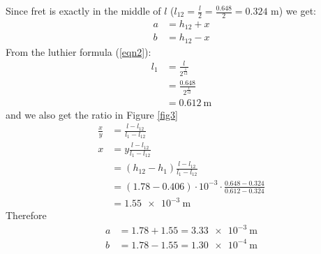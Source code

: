 Since fret  is exactly in the middle of $l$ ($l_{12} = \frac{l}{2} = \frac{0.648}{2} = 0.324$ m) we get:
\begin{align*}
    a &= h_{12} + x \\
    b &= h_{12} - x
\end{align*}
From the luthier formula (\ref{eqn2}):
\begin{align*}
    l_1 &= \frac{l}{2^{\frac{1}{12}}} \\
        &= \frac{0.648}{2^{\frac{1}{12}}} \\
        &= \SI{0.612}{\meter}
\end{align*}
and we also get the ratio in Figure \ref{fig3}
\begin{align*}
    \frac{x}{y} &= \frac{l-l_{12}}{l_1-l_{12}} \\
    x &= y\frac{l-l_{12}}{l_1-l_{12}} \\
    &= (h_{12}-h_1)\frac{l-l_{12}}{l_1-l_{12}} \\
    &= (1.78-0.406) \cdot 10^{-3} \cdot \frac{0.648-0.324}{0.612-0.324} \\
    &= \SI{1.55e-3}{\meter}
\end{align*}
Therefore
\begin{align*}
    a &= 1.78 + 1.55 = \SI{3.33e-3}{\meter} \\
    b &= 1.78 - 1.55 = \SI{1.30e-4}{\meter}
\end{align*}